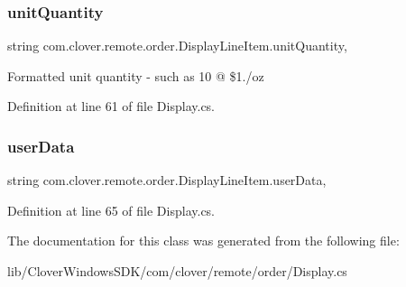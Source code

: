 \subsubsection{\texorpdfstring{unit\+Quantity}{unitQuantity}}
{\footnotesize\ttfamily string com.\+clover.\+remote.\+order.\+Display\+Line\+Item.\+unit\+Quantity\hspace{0.3cm}{\ttfamily [get]}, {\ttfamily [set]}}

Formatted unit quantity -\/ such as 10 @ \$1./oz 

Definition at line 61 of file Display.\+cs.

\mbox{\label{classcom_1_1clover_1_1remote_1_1order_1_1_display_line_item_a71d721c74156b5bab1068bf29540300c}} 
\subsubsection{\texorpdfstring{user\+Data}{userData}}
{\footnotesize\ttfamily string com.\+clover.\+remote.\+order.\+Display\+Line\+Item.\+user\+Data\hspace{0.3cm}{\ttfamily [get]}, {\ttfamily [set]}}



Definition at line 65 of file Display.\+cs.



The documentation for this class was generated from the following file\+:\begin{DoxyCompactItemize}
\item 
lib/\+Clover\+Windows\+S\+D\+K/com/clover/remote/order/Display.\+cs\end{DoxyCompactItemize}
